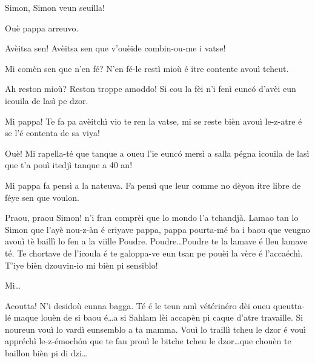\begin{drama}

\Cienspeaks Simon, Simon veun seuilla!

\Simonspeaks Ouè pappa arreuvo.

\Cienspeaks Avèitsa sen! Avèitsa sen que v'ouèide combin-ou-me i vatse!

\Simonspeaks Mi comèn sen que n’en fé? N’en fé-le restì mioù é itre contente avouì tcheut. 

\Cienspeaks Ah reston mioù? Reston troppe amoddo! Si cou la fèi n'i fenì eunc\'o d'avèi eun icouila de lasì pe dzor. 

\Simonspeaks Mi pappa! Te fa pa avèitchì vio te ren la vatse, mi se reste bièn avouì le-z-atre é se l’é contenta de sa viya!

\Cienspeaks Ouè! Mi rapella-té que tanque a oueu l'ie eunc\'o mersì a salla pégna icouila de lasì que t'a pouì itedjì tanque a 40 an! 

\Simonspeaks{} Mi pappa fa pensì a la nateuva. Fa pensì que leur comme no dèyon itre libre de féye sen que voulon.

\Cienspeaks Praou, praou Simon! n’i fran comprèi que lo mondo l’a tchandjà. Lamao tan lo Simon que l’ayè nou-z-àn é criyave pappa, pappa pourta-mé ba i baou que veugno avouì tè baillì lo fen a la viille Poudre. Poudre\ldots Poudre te la lamave é lleu lamave té. Te chortave de l’icoula é te galoppa-ve eun tsan pe pouèi la vère é l’accaéchì. T'iye bièn dzouvin-io mi bièn pi sensiblo!

\Simonspeaks Mi\ldots

\Cienspeaks Acoutta! N’i desidoù eunna bagga. Té é le teun amì vétérinéro dèi oueu queutta-lé maque louèn de si baou é\ldots a si Sahlam lèi accapèn pi caque d’atre travaille. Si noureun vouì lo vardì  eunsemblo a ta mamma. Vouì lo traillì tcheu le dzor é vouì appréchì le-z-émoch\'on que te fan prouì le bitche tcheu le dzor\ldots que chouèn te baillon bièn pi di dzi\ldots

\ridocliou

\DeriLeRido
{}

\end{drama}